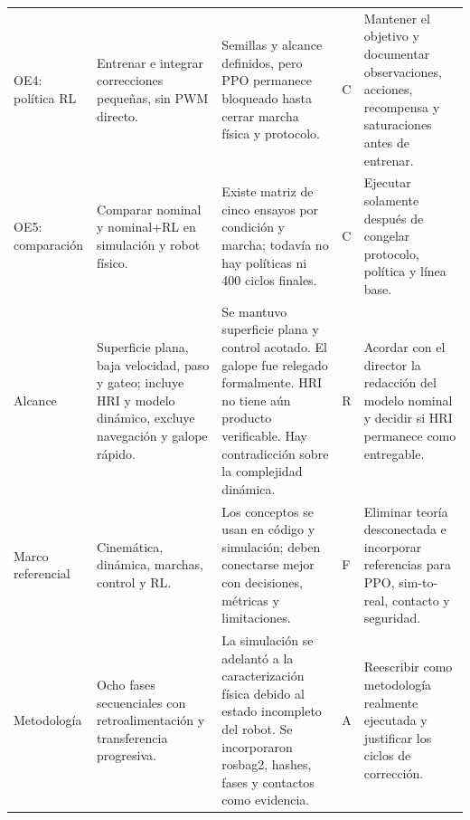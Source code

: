 \documentclass[11pt,letterpaper]{article}
\begin{document}
\begin{landscape}
\begin{longtable}{p{2.6cm}p{5.0cm}p{6.1cm}p{1.8cm}p{6.0cm}}
OE4: política RL & Entrenar e integrar correcciones pequeñas, sin PWM directo. & Semillas y alcance definidos, pero PPO permanece bloqueado hasta cerrar marcha física y protocolo. & C & Mantener el objetivo y documentar observaciones, acciones, recompensa y saturaciones antes de entrenar.\\
OE5: comparación & Comparar nominal y nominal+RL en simulación y robot físico. & Existe matriz de cinco ensayos por condición y marcha; todavía no hay políticas ni 400 ciclos finales. & C & Ejecutar solamente después de congelar protocolo, política y línea base.\\
Alcance & Superficie plana, baja velocidad, paso y gateo; incluye HRI y modelo dinámico, excluye navegación y galope rápido. & Se mantuvo superficie plana y control acotado. El galope fue relegado formalmente. HRI no tiene aún producto verificable. Hay contradicción sobre la complejidad dinámica. & R & Acordar con el director la redacción del modelo nominal y decidir si HRI permanece como entregable.\\
Marco referencial & Cinemática, dinámica, marchas, control y RL. & Los conceptos se usan en código y simulación; deben conectarse mejor con decisiones, métricas y limitaciones. & F & Eliminar teoría desconectada e incorporar referencias para PPO, sim-to-real, contacto y seguridad.\\
Metodología & Ocho fases secuenciales con retroalimentación y transferencia progresiva. & La simulación se adelantó a la caracterización física debido al estado incompleto del robot. Se incorporaron rosbag2, hashes, fases y contactos como evidencia. & A & Reescribir como metodología realmente ejecutada y justificar los ciclos de corrección.\\
\bottomrule
\end{longtable}
\end{landscape}
\end{document}
